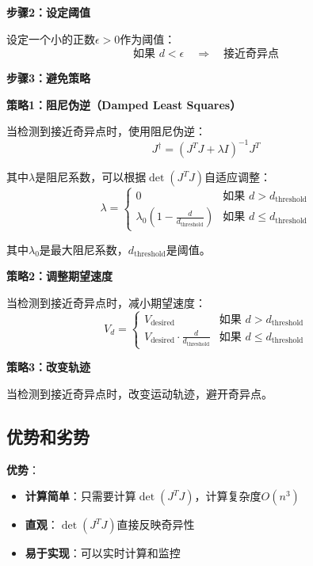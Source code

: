 \documentclass[12pt,a4paper]{article}
\begin{document}
\textbf{步骤2：设定阈值}

设定一个小的正数$\epsilon > 0$作为阈值：
\begin{equation}
\text{如果 } d < \epsilon \quad \Rightarrow \quad \text{接近奇异点}
\end{equation}

\textbf{步骤3：避免策略}

\textbf{策略1：阻尼伪逆（Damped Least Squares）}

当检测到接近奇异点时，使用阻尼伪逆：
\begin{equation}
J^{\dagger} = (J^T J + \lambda I)^{-1}J^T \tag{阻尼伪逆}
\end{equation}

其中$\lambda$是阻尼系数，可以根据$\det(J^T J)$自适应调整：
\begin{equation}
\lambda = \begin{cases}
0 & \text{如果 } d > d_{\text{threshold}} \\
\lambda_0\left(1 - \frac{d}{d_{\text{threshold}}}\right) & \text{如果 } d \leq d_{\text{threshold}}
\end{cases}
\end{equation}

其中$\lambda_0$是最大阻尼系数，$d_{\text{threshold}}$是阈值。

\textbf{策略2：调整期望速度}

当检测到接近奇异点时，减小期望速度：
\begin{equation}
V_d = \begin{cases}
V_{\text{desired}} & \text{如果 } d > d_{\text{threshold}} \\
V_{\text{desired}} \cdot \frac{d}{d_{\text{threshold}}} & \text{如果 } d \leq d_{\text{threshold}}
\end{cases}
\end{equation}

\textbf{策略3：改变轨迹}

当检测到接近奇异点时，改变运动轨迹，避开奇异点。

\subsection{优势和劣势}

\textbf{优势}：
\begin{itemize}
\item \textbf{计算简单}：只需要计算$\det(J^T J)$，计算复杂度$O(n^3)$
\item \textbf{直观}：$\det(J^T J)$直接反映奇异性
\item \textbf{易于实现}：可以实时计算和监控
\end{itemize}
\end{document}
